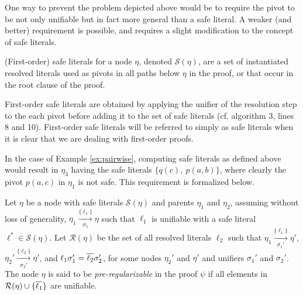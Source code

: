 One way to prevent the problem depicted above would be to require the pivot to be not only unifiable but in fact more general than a safe literal. A weaker (and better) requirement is possible, and requires a slight modification to the concept of safe literals. 

\begin{definition}
(First-order) safe literals for a node $\eta$, denoted $\mathcal{S}(\eta)$, are a set of instantiated resolved literals used as pivots in all paths below $\eta$ in the proof, or that occur in the root clause of the proof.
\end{definition}

First-order safe literals are obtained by applying the unifier of the resolution step to the each pivot before adding it to the set of safe literals (cf. algorithm 3, lines 8 and 10). First-order safe literals will be referred to simply as safe literals when it is clear that we are dealing with first-order proofs.


 In the case of Example \ref{ex:pairwise}, computing safe literals as defined above would result in $\eta_3$ having the safe literals $\{q(c),~p(a,b)\}$, where clearly the pivot $p(a,c)$ in $\eta_1$ is not safe. This requirement is formalized below.




\begin{definition}
\label{prop:pair}
Let $\eta$ be a node with safe literals $\mathcal{S}(\eta)$ and parents $\eta_1$ and $\eta_2$, assuming without loss of generality, $\eta_1 \xrightarrow[\sigma_1]{\{\ell_1\} } \eta$ such that $\ell_1$ is unifiable with a safe literal $\ell^* \in \mathcal{S}(\eta)$. 
Let $\mathcal{R}(\eta)$ be the set of all resolved literals $\ell_2$ such that $\eta_1 \xrightarrow[\sigma_1']{\{\ell_1\} } \eta'$, $\eta_2' \xrightarrow[\sigma_2']{\{\ell_2\} } \eta'$, and $\ell_1\sigma_1'=\overline{\ell_2}\sigma_2'$, for some nodes $\eta_2'$ and $\eta'$ and unifiers $\sigma_1'$ and $\sigma_2'$.
The node $\eta$ is said to be \emph{pre-regularizable} in the proof $\psi$ if all elements in $\mathcal{R}(\eta) \cup \{ \overline{\ell_1}\}$ are unifiable.
\end{definition}

